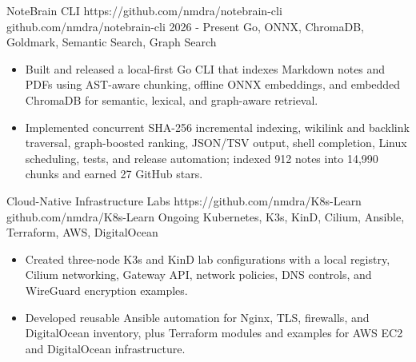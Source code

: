 \projectentry
  {NoteBrain CLI}
  {https://github.com/nmdra/notebrain-cli}
  {github.com/nmdra/notebrain-cli}
  {2026 - Present}
  {Go, ONNX, ChromaDB, Goldmark, Semantic Search, Graph Search}

\begin{itemize}
  \item Built and released a local-first Go CLI that indexes Markdown notes and PDFs using AST-aware chunking, offline ONNX embeddings, and embedded ChromaDB for semantic, lexical, and graph-aware retrieval.
  \item Implemented concurrent SHA-256 incremental indexing, wikilink and backlink traversal, graph-boosted ranking, JSON/TSV output, shell completion, Linux scheduling, tests, and release automation; indexed 912 notes into 14,990 chunks and earned 27 GitHub stars.
\end{itemize}

\projectentry
  {Cloud-Native Infrastructure Labs}
  {https://github.com/nmdra/K8s-Learn}
  {github.com/nmdra/K8s-Learn}
  {Ongoing}
  {Kubernetes, K3s, KinD, Cilium, Ansible, Terraform, AWS, DigitalOcean}

\begin{itemize}
  \item Created three-node K3s and KinD lab configurations with a local registry, Cilium networking, Gateway API, network policies, DNS controls, and WireGuard encryption examples.
  \item Developed reusable Ansible automation for Nginx, TLS, firewalls, and DigitalOcean inventory, plus Terraform modules and examples for AWS EC2 and DigitalOcean infrastructure.
\end{itemize}
